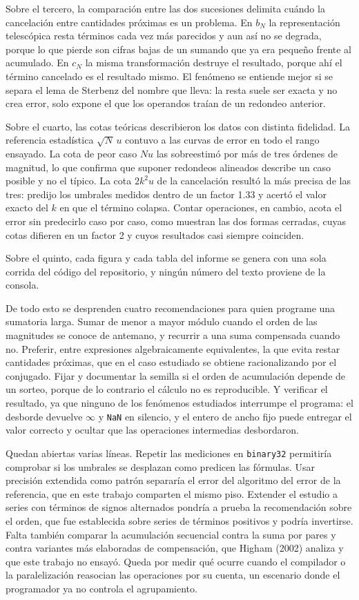 Sobre el tercero, la comparación entre las dos sucesiones delimita cuándo la cancelación entre
cantidades próximas es un problema. En $b_N$ la representación telescópica resta términos cada vez
más parecidos y aun así no se degrada, porque lo que pierde son cifras bajas de un sumando que ya
era pequeño frente al acumulado. En $c_N$ la misma transformación destruye el resultado, porque ahí
el término cancelado es el resultado mismo. El fenómeno se entiende mejor si se separa el lema de
Sterbenz del nombre que lleva: la resta suele ser exacta y no crea error, solo expone el que los
operandos traían de un redondeo anterior.

Sobre el cuarto, las cotas teóricas describieron los datos con distinta fidelidad. La referencia
estadística $\sqrt{N}\,u$ contuvo a las curvas de error en todo el rango ensayado. La cota de peor
caso $Nu$ las sobreestimó por más de tres órdenes de magnitud, lo que confirma que suponer redondeos
alineados describe un caso posible y no el típico. La cota $2k^{2}u$ de la cancelación resultó la
más precisa de las tres: predijo los umbrales medidos
dentro de un factor 1.33 y acertó el valor exacto del $k$ en que el término colapsa. Contar
operaciones, en cambio, acota el error sin predecirlo caso por caso, como muestran las dos formas
cerradas, cuyas cotas difieren en un factor 2 y cuyos resultados casi siempre coinciden.

Sobre el quinto, cada figura y cada tabla del informe se genera con una sola corrida del código del
repositorio, y ningún número del texto proviene de la consola.

De todo esto se desprenden cuatro recomendaciones para quien programe una sumatoria larga. Sumar de
menor a mayor módulo cuando el orden de las magnitudes se conoce de antemano, y recurrir a una suma
compensada cuando no. Preferir, entre expresiones algebraicamente equivalentes, la que evita restar
cantidades próximas, que en el caso estudiado se obtiene racionalizando por el conjugado. Fijar y
documentar la semilla si el orden de acumulación depende de un sorteo, porque de lo contrario el
cálculo no es reproducible. Y verificar el resultado, ya que ninguno de los fenómenos estudiados
interrumpe el programa: el desborde devuelve $\infty$ y \texttt{NaN} en silencio, y el entero de
ancho fijo puede entregar el valor correcto y ocultar que las operaciones intermedias desbordaron.

Quedan abiertas varias líneas. Repetir las mediciones en \texttt{binary32} permitiría comprobar si
los umbrales se desplazan como predicen las fórmulas. Usar precisión extendida como patrón separaría
el error del algoritmo del error de la referencia, que en este trabajo comparten el mismo piso.
Extender el estudio a series con términos de signos alternados pondría a prueba la recomendación
sobre el orden, que fue establecida sobre series de términos positivos y podría invertirse. Falta
también comparar la acumulación secuencial contra la suma por pares y contra variantes más
elaboradas de compensación, que Higham (2002) analiza y que este trabajo no ensayó. Queda por medir
qué ocurre cuando el compilador o la paralelización reasocian las operaciones por su cuenta, un
escenario donde el programador ya no controla el agrupamiento.
